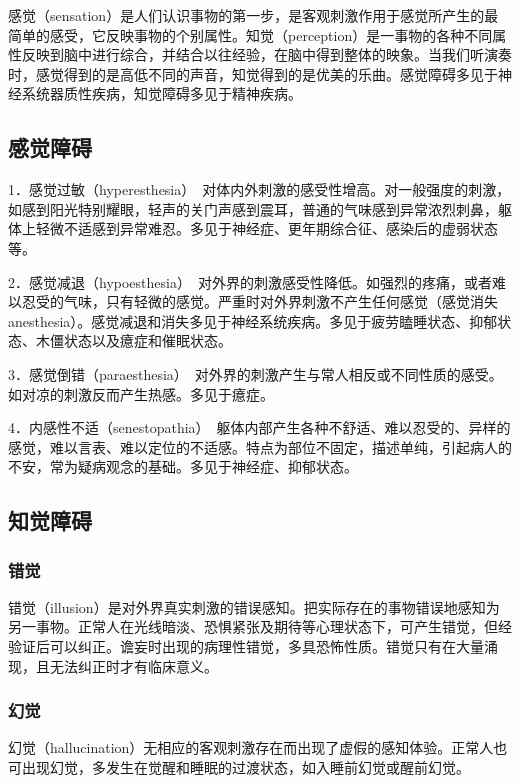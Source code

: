 感觉（sensation）是人们认识事物的第一步，是客观刺激作用于感觉所产生的最简单的感受，它反映事物的个别属性。知觉（perception）是一事物的各种不同属性反映到脑中进行综合，并结合以往经验，在脑中得到整体的映象。当我们听演奏时，感觉得到的是高低不同的声音，知觉得到的是优美的乐曲。感觉障碍多见于神经系统器质性疾病，知觉障碍多见于精神疾病。

\subsection{感觉障碍}

1．感觉过敏（hyperesthesia）　对体内外刺激的感受性增高。对一般强度的刺激，如感到阳光特别耀眼，轻声的关门声感到震耳，普通的气味感到异常浓烈刺鼻，躯体上轻微不适感到异常难忍。多见于神经症、更年期综合征、感染后的虚弱状态等。

2．感觉减退（hypoesthesia）　对外界的刺激感受性降低。如强烈的疼痛，或者难以忍受的气味，只有轻微的感觉。严重时对外界刺激不产生任何感觉（感觉消失anesthesia）。感觉减退和消失多见于神经系统疾病。多见于疲劳瞌睡状态、抑郁状态、木僵状态以及癔症和催眠状态。

3．感觉倒错（paraesthesia）　对外界的刺激产生与常人相反或不同性质的感受。如对凉的刺激反而产生热感。多见于癔症。

4．内感性不适（senestopathia）　躯体内部产生各种不舒适、难以忍受的、异样的感觉，难以言表、难以定位的不适感。特点为部位不固定，描述单纯，引起病人的不安，常为疑病观念的基础。多见于神经症、抑郁状态。

\subsection{知觉障碍}

\subsubsection{错觉}

错觉（illusion）是对外界真实刺激的错误感知。把实际存在的事物错误地感知为另一事物。正常人在光线暗淡、恐惧紧张及期待等心理状态下，可产生错觉，但经验证后可以纠正。谵妄时出现的病理性错觉，多具恐怖性质。错觉只有在大量涌现，且无法纠正时才有临床意义。

\subsubsection{幻觉}

幻觉（hallucination）无相应的客观刺激存在而出现了虚假的感知体验。正常人也可出现幻觉，多发生在觉醒和睡眠的过渡状态，如入睡前幻觉或醒前幻觉。


